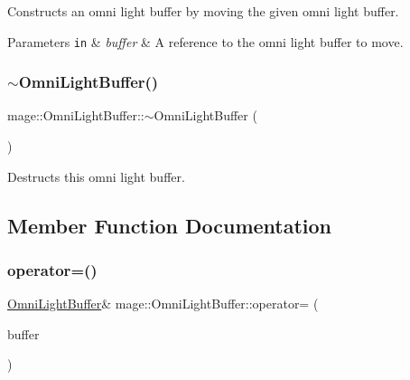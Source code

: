 Constructs an omni light buffer by moving the given omni light buffer.


\begin{DoxyParams}[1]{Parameters}
\mbox{\tt in}  & {\em buffer} & A reference to the omni light buffer to move. \\
\hline
\end{DoxyParams}
\hypertarget{structmage_1_1_omni_light_buffer_a80869a9637c8b3a40ee6da63b247faed}{}\label{structmage_1_1_omni_light_buffer_a80869a9637c8b3a40ee6da63b247faed} 
\subsubsection{\texorpdfstring{$\sim$\+Omni\+Light\+Buffer()}{~OmniLightBuffer()}}
{\footnotesize\ttfamily mage\+::\+Omni\+Light\+Buffer\+::$\sim$\+Omni\+Light\+Buffer (\begin{DoxyParamCaption}{ }\end{DoxyParamCaption})\hspace{0.3cm}{\ttfamily [default]}}

Destructs this omni light buffer. 

\subsection{Member Function Documentation}
\hypertarget{structmage_1_1_omni_light_buffer_afc27989dfccb6bc8b58be462d35b989e}{}\label{structmage_1_1_omni_light_buffer_afc27989dfccb6bc8b58be462d35b989e} 
\subsubsection{\texorpdfstring{operator=()}{operator=()}\hspace{0.1cm}{\footnotesize\ttfamily [1/2]}}
{\footnotesize\ttfamily \hyperlink{structmage_1_1_omni_light_buffer}{Omni\+Light\+Buffer}\& mage\+::\+Omni\+Light\+Buffer\+::operator= (\begin{DoxyParamCaption}\item[{const \hyperlink{structmage_1_1_omni_light_buffer}{Omni\+Light\+Buffer} \&}]{buffer }\end{DoxyParamCaption})\hspace{0.3cm}{\ttfamily [default]}}

